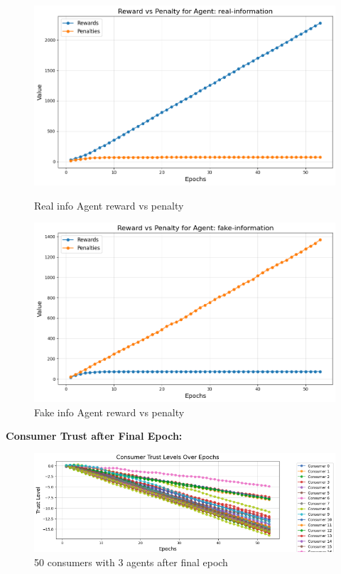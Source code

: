 \documentclass[twoside]{article}
\begin{document}
 \begin{figure}[htbp]
     \centering
     \begin{minipage}[b]{0.45\textwidth}
         \centering
         \includegraphics[width=\textwidth]{../results/50consumer/real_rp.png}
         \caption{Real info Agent reward vs penalty}
         \label{fig:image3}
     \end{minipage}
     \hfill
     \begin{minipage}[b]{0.45\textwidth}
         \centering
         \includegraphics[width=\textwidth]{../results/50consumer/fake_rp.png}
         \caption{Fake info Agent reward vs penalty}
         \label{fig:image4}
     \end{minipage}
 \end{figure}


\pagebreak
\textbf{Consumer Trust after Final Epoch: }

\begin{figure}[htbp]
     \centering
     \includegraphics[width=1.0\textwidth]{../results/50consumer/finaltrust.png}
     \caption{50 consumers with 3 agents after final epoch}
     \label{fig: 50 consumer, 3 agentss}
 \end{figure}
\end{document}
